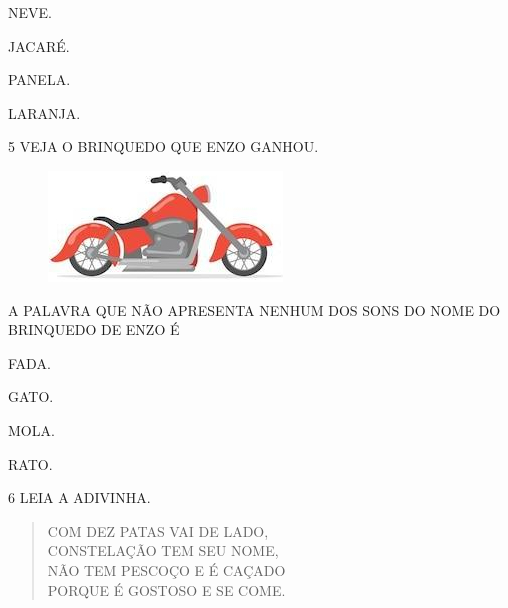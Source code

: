 \begin{multicols}{2}
\begin{escolha}%
\item NEVE.

\item JACARÉ.

\item PANELA.

\item LARANJA.
\end{escolha}
\end{multicols}

\pagebreak

\num{5} VEJA O BRINQUEDO QUE ENZO GANHOU.

\begin{figure}[H]
\centering
\includegraphics[width=.6\textwidth]{media/image245.jpg}
\end{figure}


A PALAVRA QUE NÃO APRESENTA NENHUM DOS SONS DO NOME DO BRINQUEDO DE ENZO É

\begin{multicols}{2}
\begin{escolha}
\item FADA.

\item GATO.

\item MOLA.

\item RATO.
\end{escolha}
\end{multicols}

\num{6} LEIA A ADIVINHA. 

\begin{myquote}
\begin{verse}
COM DEZ PATAS VAI DE LADO,\\
CONSTELAÇÃO TEM SEU NOME,\\
NÃO TEM PESCOÇO E É CAÇADO\\
PORQUE É GOSTOSO E SE COME.
\end{verse}

\end{myquote}

